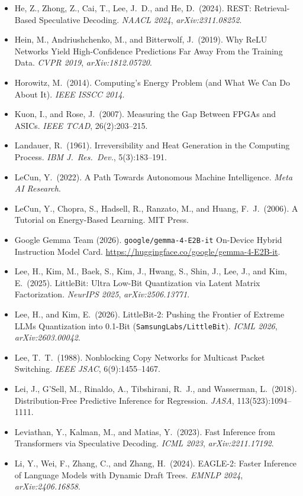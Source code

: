\documentclass[10pt]{article}
\begin{document}
{\begin{itemize}
  \item He, Z., Zhong, Z., Cai, T., Lee, J.\ D., and He, D.\ (2024). REST: Retrieval-Based Speculative Decoding. \emph{NAACL 2024}, \emph{arXiv:2311.08252}.
  \item Hein, M., Andriushchenko, M., and Bitterwolf, J.\ (2019). Why ReLU Networks Yield High-Confidence Predictions Far Away From the Training Data. \emph{CVPR 2019}, \emph{arXiv:1812.05720}.
  \item Horowitz, M.\ (2014). Computing's Energy Problem (and What We Can Do About It). \emph{IEEE ISSCC 2014}.
  \item Kuon, I., and Rose, J.\ (2007). Measuring the Gap Between FPGAs and ASICs. \emph{IEEE TCAD}, 26(2):203--215.
  \item Landauer, R.\ (1961). Irreversibility and Heat Generation in the Computing Process. \emph{IBM J.\ Res.\ Dev.}, 5(3):183--191.
  \item LeCun, Y.\ (2022). A Path Towards Autonomous Machine Intelligence. \emph{Meta AI Research}.
  \item LeCun, Y., Chopra, S., Hadsell, R., Ranzato, M., and Huang, F.\ J.\ (2006). A Tutorial on Energy-Based Learning. MIT Press.
  \item Google Gemma Team (2026). \texttt{google/gemma-4-E2B-it} On-Device Hybrid Instruction Model Card. \url{https://huggingface.co/google/gemma-4-E2B-it}.
  \item Lee, H., Kim, M., Baek, S., Kim, J., Hwang, S., Shin, J., Lee, J., and Kim, E.\ (2025). LittleBit: Ultra Low-Bit Quantization via Latent Matrix Factorization. \emph{NeurIPS 2025}, \emph{arXiv:2506.13771}.
  \item Lee, H., and Kim, E.\ (2026). LittleBit-2: Pushing the Frontier of Extreme LLMs Quantization into 0.1-Bit (\texttt{SamsungLabs/LittleBit}). \emph{ICML 2026}, \emph{arXiv:2603.00042}.
  \item Lee, T.\ T.\ (1988). Nonblocking Copy Networks for Multicast Packet Switching. \emph{IEEE JSAC}, 6(9):1455--1467.
  \item Lei, J., G'Sell, M., Rinaldo, A., Tibshirani, R.\ J., and Wasserman, L.\ (2018). Distribution-Free Predictive Inference for Regression. \emph{JASA}, 113(523):1094--1111.
  \item Leviathan, Y., Kalman, M., and Matias, Y.\ (2023). Fast Inference from Transformers via Speculative Decoding. \emph{ICML 2023}, \emph{arXiv:2211.17192}.
  \item Li, Y., Wei, F., Zhang, C., and Zhang, H.\ (2024). EAGLE-2: Faster Inference of Language Models with Dynamic Draft Trees. \emph{EMNLP 2024}, \emph{arXiv:2406.16858}.

\end{itemize}}
\end{document}
